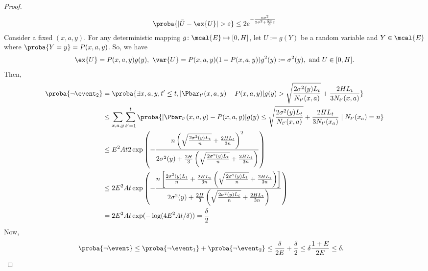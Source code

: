 \begin{proof}
\begin{align*}
            \proba{|\bar{U}-\ex{U}|> \varepsilon} \le 2e^{-\frac{n\varepsilon^2}{2\sigma^2+\frac{2c}3\varepsilon}}
            \end{align*}
            Consider a fixed $(x,a,y)$. For any deterministic mapping $g\colon\mcal{E}\mapsto[0,H]$, let $U:=g(Y)$ be a random variable and $Y\in\mcal{E}$ where $\proba{Y=y}=P(x,a,y)$.
            So, we have
            \begin{align*}
            \ex{U}=P(x,a,y)g(y),\ \var{U}=P(x,a,y)(1-P(x,a,y))g^2(y):=\sigma^2(y), \text{ and } U\in[0,H].
            \end{align*}
            Then,
            \begin{align*}
            \proba{\neg\event_2}
            &=\proba{\exists x,a,y,t'\le t,|\Pbar_{t'}(x,a,y)-P(x,a,y)|g(y) >\sqrt{\frac{2\sigma^2(y)L_t}{N_{t'}(x,a)}} +\frac{2HL_t}{3N_{t'}(x,a)}} \\
            &\le\sum_{x,a,y} \sum_{t'=1}^{t} \proba{|\Pbar_{t'}(x,a,y)-P(x,a,y)|g(y) \le\sqrt{\frac{2\sigma^2(y)L_t}{N_{t'}(x,a)}} +\frac{2HL_t}{3N_{t'}(x_a)}\mid N_{t'}(x_a)=n} \\
            &\le E^2At 2\exp\left(-\frac{n\left(\sqrt{\frac{2\sigma^2(y)L_t}{n}} +\frac{2HL_t}{3n}\right)^2}{2\sigma^2(y)+\frac{2H}{3}\left(\sqrt{\frac{2\sigma^2(y)L_t}{n}} +\frac{2HL_t}{3n}\right)}\right) \\
            &\le 2E^2At\exp\left(-\frac{n\left[\frac{2\sigma^2(y)L_t}{n} +\frac{2HL_t}{3n}\left(\sqrt{\frac{2\sigma^2(y)L_t}{n}} +\frac{2HL_t}{3n}\right)\right]}{2\sigma^2(y)+\frac{2H}{3}\left(\sqrt{\frac{2\sigma^2(y)L_t}{n}} +\frac{2HL_t}{3n}\right)}\right) \\
            &=2E^2At\exp(-\log(4E^2At/\delta)) = \frac{\delta}2
            \end{align*}
            Now,
            \begin{align*}
            \proba{\neg\event} 
            &\le\proba{\neg\event_1} +\proba{\neg\event_2}\le\frac{\delta}{2E} +\frac{\delta}2\le \delta\frac{1+E}{2E} \le \delta.
            \end{align*}
            \end{proof}
            

